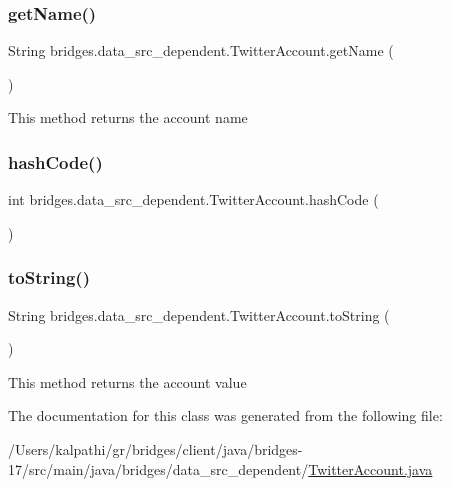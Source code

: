 \subsubsection{\texorpdfstring{get\+Name()}{getName()}}
{\footnotesize\ttfamily String bridges.\+data\+\_\+src\+\_\+dependent.\+Twitter\+Account.\+get\+Name (\begin{DoxyParamCaption}{ }\end{DoxyParamCaption})}

This method returns the account name \mbox{\label{classbridges_1_1data__src__dependent_1_1_twitter_account_a2f89f6f336b1bd39f0cf3aa444c76885}} 
\subsubsection{\texorpdfstring{hash\+Code()}{hashCode()}}
{\footnotesize\ttfamily int bridges.\+data\+\_\+src\+\_\+dependent.\+Twitter\+Account.\+hash\+Code (\begin{DoxyParamCaption}{ }\end{DoxyParamCaption})}

\mbox{\label{classbridges_1_1data__src__dependent_1_1_twitter_account_af4dd5dfe1a1556fa57f917fb24d8d6f2}} 
\subsubsection{\texorpdfstring{to\+String()}{toString()}}
{\footnotesize\ttfamily String bridges.\+data\+\_\+src\+\_\+dependent.\+Twitter\+Account.\+to\+String (\begin{DoxyParamCaption}{ }\end{DoxyParamCaption})}

This method returns the account value 

The documentation for this class was generated from the following file\+:\begin{DoxyCompactItemize}
\item 
/\+Users/kalpathi/gr/bridges/client/java/bridges-\/17/src/main/java/bridges/data\+\_\+src\+\_\+dependent/\mbox{\hyperlink{_twitter_account_8java}{Twitter\+Account.\+java}}\end{DoxyCompactItemize}
